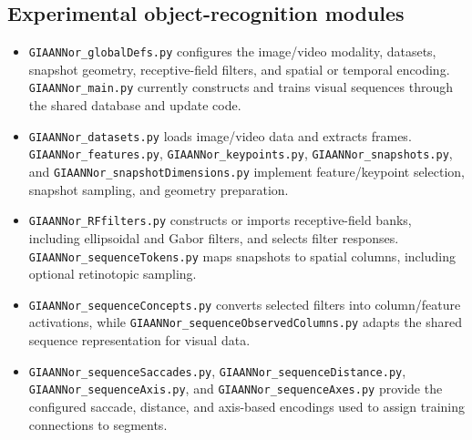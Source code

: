 \subsection{Experimental object-recognition modules}
\begin{itemize}
	\item \texttt{GIAANNor\_globalDefs.py} configures the image/video modality, datasets, snapshot geometry, receptive-field filters, and spatial or temporal encoding. \texttt{GIAANNor\_main.py} currently constructs and trains visual sequences through the shared database and update code.
	\item \texttt{GIAANNor\_datasets.py} loads image/video data and extracts frames. \texttt{GIAANNor\_features.py}, \texttt{GIAANNor\_keypoints.py}, \texttt{GIAANNor\_snapshots.py}, and \texttt{GIAANNor\_snapshotDimensions.py} implement feature/keypoint selection, snapshot sampling, and geometry preparation.
	\item \texttt{GIAANNor\_RFfilters.py} constructs or imports receptive-field banks, including ellipsoidal and Gabor filters, and selects filter responses. \texttt{GIAANNor\_sequenceTokens.py} maps snapshots to spatial columns, including optional retinotopic sampling.
	\item \texttt{GIAANNor\_sequenceConcepts.py} converts selected filters into column/feature activations, while \texttt{GIAANNor\_sequenceObservedColumns.py} adapts the shared sequence representation for visual data.
	\item \texttt{GIAANNor\_sequenceSaccades.py}, \texttt{GIAANNor\_sequenceDistance.py}, \texttt{GIAANNor\_sequenceAxis.py}, and \texttt{GIAANNor\_sequenceAxes.py} provide the configured saccade, distance, and axis-based encodings used to assign training connections to segments.
\end{itemize}
